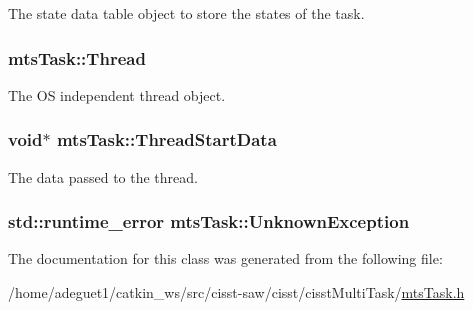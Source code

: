 The state data table object to store the states of the task. \hypertarget{classmts_task_a020aaf3f85e33991c3b349138b826218}{
\subsubsection[{Thread}]{ mts\-Task\-::\-Thread\hspace{0.3cm}{\ttfamily [protected]}}}\label{classmts_task_a020aaf3f85e33991c3b349138b826218}
The O\-S independent thread object. \hypertarget{classmts_task_a0f4d0bdac8ce91bd7a44a80d0903165b}{
\subsubsection[{Thread\-Start\-Data}]{\setlength{\rightskip}{0pt plus 5cm}void$\ast$ mts\-Task\-::\-Thread\-Start\-Data\hspace{0.3cm}{\ttfamily [protected]}}}\label{classmts_task_a0f4d0bdac8ce91bd7a44a80d0903165b}
The data passed to the thread. \hypertarget{classmts_task_a518652604363d9402292a67c1836e888}{
\subsubsection[{Unknown\-Exception}]{\setlength{\rightskip}{0pt plus 5cm}std\-::runtime\-\_\-error mts\-Task\-::\-Unknown\-Exception\hspace{0.3cm}{\ttfamily [static]}}}\label{classmts_task_a518652604363d9402292a67c1836e888}


The documentation for this class was generated from the following file\-:\begin{DoxyCompactItemize}
\item 
/home/adeguet1/catkin\-\_\-ws/src/cisst-\/saw/cisst/cisst\-Multi\-Task/\hyperlink{mts_task_8h}{mts\-Task.\-h}\end{DoxyCompactItemize}
